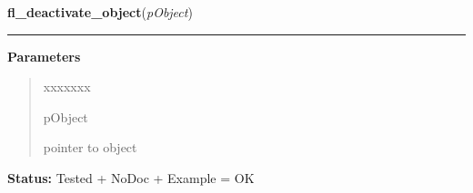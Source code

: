     \label{xformslib:library:fl_deactivate_object}

    \vspace{0.5ex}

\hspace{.8\funcindent}\begin{boxedminipage}{\funcwidth}

    \raggedright \textbf{fl\_deactivate\_object}(\textit{pObject})

    \vspace{-1.5ex}

    \rule{\textwidth}{0.5\fboxrule}
\setlength{\parskip}{2ex}
\setlength{\parskip}{1ex}
      \textbf{Parameters}
      \vspace{-1ex}

      \begin{quote}
        \begin{Ventry}{xxxxxxx}

          \item[pObject]

          pointer to object

        \end{Ventry}

      \end{quote}

\textbf{Status:} Tested + NoDoc + Example = OK



    \end{boxedminipage}

    \label{xformslib:library:fl_object_is_active}

    \vspace{0.5ex}

